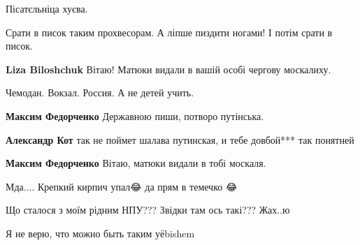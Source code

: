 \begin{itemize}
Пісатєльніца хуєва.

Срати в писок таким прохвесорам. А ліпше пиздити ногами! І потім срати в писок.

\begin{itemize}

\textbf{Liza Biloshchuk} Вітаю! Матюки видали в вашій особі чергову москалиху.
\end{itemize}


Чемодан. Вокзал. Россия. А не детей учить.

\begin{itemize}

\textbf{Максим Федорченко} Державною пиши, потворо путінська.


\textbf{Александр Кот} так не поймет шалава путинская, и тебе довбой*** так понятней


\textbf{Максим Федорченко} Вітаю, матюки видали в тобі москаля.
\end{itemize}


Мда.... Крепкий кирпич упал😂 да прям в темечко 😂


Що сталося з моїм рідним НПУ??? Звідки там ось такі??? Жах..ю


Я не верю, что можно быть таким уёbishem

\begin{itemize}


\end{itemize}
\end{itemize}
